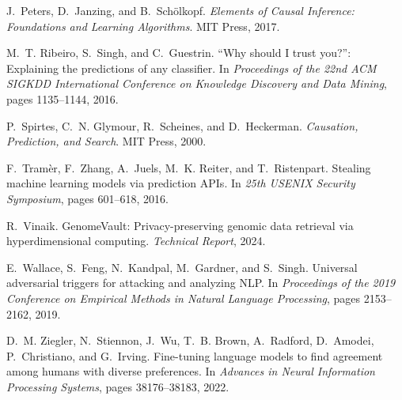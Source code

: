 \documentclass[11pt,a4paper]{article}
\begin{document}
\begin{thebibliography}{10}
J.~Peters, D.~Janzing, and B.~Schölkopf.
\newblock \textit{Elements of Causal Inference: Foundations and Learning Algorithms}.
\newblock MIT Press, 2017.

M.~T. Ribeiro, S.~Singh, and C.~Guestrin.
\newblock ``Why should I trust you?'': Explaining the predictions of any classifier.
\newblock In \textit{Proceedings of the 22nd ACM SIGKDD International Conference on Knowledge Discovery and Data Mining}, pages 1135--1144, 2016.

P.~Spirtes, C.~N. Glymour, R.~Scheines, and D.~Heckerman.
\newblock \textit{Causation, Prediction, and Search}.
\newblock MIT Press, 2000.

F.~Tramèr, F.~Zhang, A.~Juels, M.~K. Reiter, and T.~Ristenpart.
\newblock Stealing machine learning models via prediction APIs.
\newblock In \textit{25th USENIX Security Symposium}, pages 601--618, 2016.

R.~Vinaik.
\newblock GenomeVault: Privacy-preserving genomic data retrieval via hyperdimensional computing.
\newblock \textit{Technical Report}, 2024.

E.~Wallace, S.~Feng, N.~Kandpal, M.~Gardner, and S.~Singh.
\newblock Universal adversarial triggers for attacking and analyzing NLP.
\newblock In \textit{Proceedings of the 2019 Conference on Empirical Methods in Natural Language Processing}, pages 2153--2162, 2019.

D.~M. Ziegler, N.~Stiennon, J.~Wu, T.~B. Brown, A.~Radford, D.~Amodei, P.~Christiano, and G.~Irving.
\newblock Fine-tuning language models to find agreement among humans with diverse preferences.
\newblock In \textit{Advances in Neural Information Processing Systems}, pages 38176--38183, 2022.

\end{thebibliography}
\end{document}
